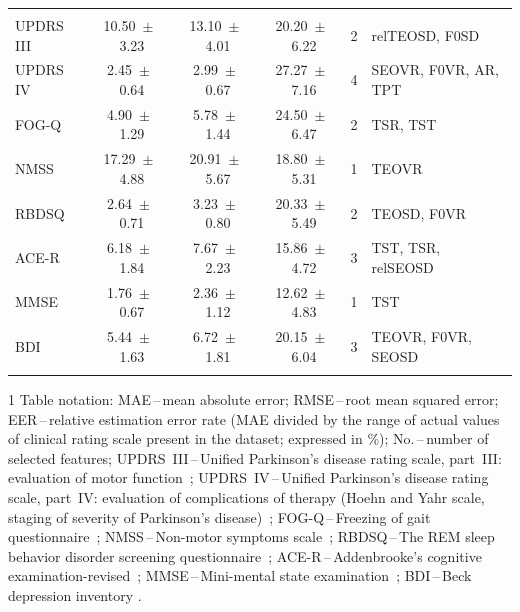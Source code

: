 \begin{table}[htb!]
\begin{threeparttable}
\begin{tabular}{l c c c c l}
			\noalign{\smallskip}\hline\noalign{\smallskip}
			\multicolumn{6}{c}{Stress-modified reading} \\
			\noalign{\smallskip}\hline\noalign{\smallskip}
			
			UPDRS III & 10.50~$\pm$~3.23 & 13.10~$\pm$~4.01 & 20.20~$\pm$~6.22 & 2 & relTEOSD, F0SD \\
			UPDRS IV  &  2.45~$\pm$~0.64 &  2.99~$\pm$~0.67 & 27.27~$\pm$~7.16 & 4 & SEOVR, F0VR, AR, TPT \\
			FOG-Q     &  4.90~$\pm$~1.29 &  5.78~$\pm$~1.44 & 24.50~$\pm$~6.47 & 2 & TSR, TST \\
			NMSS      & 17.29~$\pm$~4.88 & 20.91~$\pm$~5.67 & 18.80~$\pm$~5.31 & 1 & TEOVR \\
			RBDSQ     &  2.64~$\pm$~0.71 &  3.23~$\pm$~0.80 & 20.33~$\pm$~5.49 & 2 & TEOSD, F0VR \\
			ACE-R     &  6.18~$\pm$~1.84 &  7.67~$\pm$~2.23 & 15.86~$\pm$~4.72 & 3 & TST, TSR, relSEOSD \\
			MMSE      &  1.76~$\pm$~0.67 &  2.36~$\pm$~1.12 & 12.62~$\pm$~4.83 & 1 & TST \\
			BDI       &  5.44~$\pm$~1.63 &  6.72~$\pm$~1.81 & 20.15~$\pm$~6.04 & 3 & TEOVR, F0VR, SEOSD \\
			
			\noalign{\smallskip}\hline\hline
		\end{tabular}
		
		\begin{tablenotes}
		\scriptsize
			\item[1] Table notation: MAE\,--\,mean absolute error; RMSE\,--\,root mean squared error; EER\,--\,relative estimation error rate (MAE divided by the range of actual values of clinical rating scale present in the dataset; expressed in $\%$); No.\,--\,number of selected features; UPDRS~III\,--\,Unified Parkinson's disease rating scale, part~III: evaluation of motor function~\cite{Fahn1987}; UPDRS~IV\,--\,Unified Parkinson's disease rating scale, part~IV: evaluation of complications of therapy (Hoehn and Yahr scale, staging of severity of Parkinson's disease)~\cite{Fahn1987}; FOG-Q\,--\,Freezing of gait questionnaire~\cite{Giladi2000}; NMSS\,--\,Non-motor symptoms scale~\cite{Chaudhuri2007}; RBDSQ\,--\,The REM sleep behavior disorder screening questionnaire~\cite{Stiasny2007}; ACE-R\,--\,Addenbrooke's cognitive examination-revised~\cite{Larner2007}; MMSE\,--\,Mini-mental state examination~\cite{Folstein1975}; BDI\,--\,Beck depression inventory \cite{Beck2000, Beck1961}.
		\end{tablenotes}
	\end{threeparttable}
\end{table}

